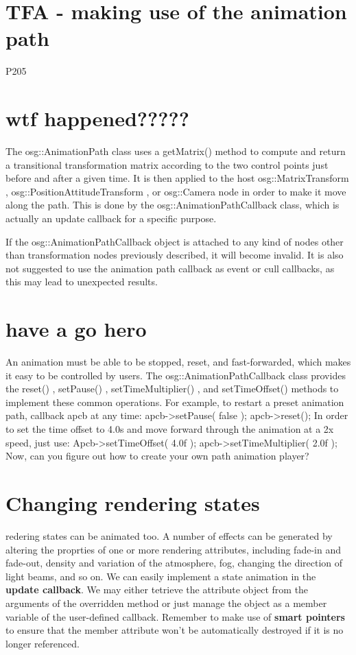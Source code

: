 \documentclass[a4paper,12pt]{book}
\begin{document}
\section{TFA - making use of the animation path}

P205

\section{wtf happened?????}
The osg::AnimationPath class uses a getMatrix() method to compute and
return a transitional transformation matrix according to the two control points just
before and after a given time. It is then applied to the host osg::MatrixTransform ,
osg::PositionAttitudeTransform , or osg::Camera node in order to make it move
along the path. This is done by the osg::AnimationPathCallback class, which is actually
an update callback for a specific purpose.

If the osg::AnimationPathCallback object is attached to any kind of nodes other
than transformation nodes previously described, it will become invalid. It is also not
suggested to use the animation path callback as event or cull callbacks, as this may lead
to unexpected results.

\section{have a go hero}
An animation must be able to be stopped, reset, and fast-forwarded, which makes it easy to
be controlled by users. The osg::AnimationPathCallback class provides the reset() ,
setPause() , setTimeMultiplier() , and setTimeOffset() methods to implement
these common operations. For example, to restart a preset animation path, callback apcb at
any time:
apcb->setPause( false );
apcb->reset();
In order to set the time offset to 4.0s and move forward through the animation at a 2x
speed, just use:
Apcb->setTimeOffset( 4.0f );
apcb->setTimeMultiplier( 2.0f );
Now, can you figure out how to create your own path animation player?

\section{Changing rendering states}
redering states can be animated too. A number of effects can be generated by altering the proprties of one or more rendering attributes, including fade-in and fade-out, density and variation of the atmosphere, fog, changing the direction of light beams, and so on.
We can easily implement a state animation in the \textbf{update callback}. We may either tetrieve the attribute object from the arguments of the overridden method or just manage the object as a member variable of the user-defined callback. Remember to make use of \textbf{smart pointers} to ensure that the member attribute won't be automatically destroyed if it is no longer referenced.\\
\end{document}
